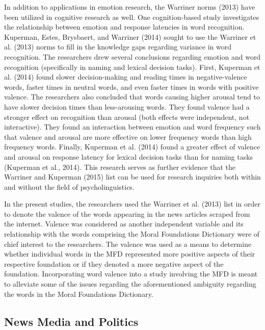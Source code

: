 \documentclass[,man]{apa6}
\begin{document}
In addition to applications in emotion research, the Warriner norms (2013) have been utilized in cognitive research as well. One cognition-based study investigates the relationship between emotion and response latencies in word recognition. Kuperman, Estes, Brysbaert, and Warriner (2014) sought to use the Warriner et al. (2013) norms to fill in the knowledge gaps regarding variance in word recognition. The researchers drew several conclusions regarding emotion and word recognition (specifically in naming and lexical decision tasks). First, Kuperman et al. (2014) found slower decision-making and reading times in negative-valence words, faster times in neutral words, and even faster times in words with positive valence. The researchers also concluded that words causing higher arousal tend to have slower decision times than less-arousing words. They found valence had a stronger effect on recognition than arousal (both effects were independent, not interactive). They found an interaction between emotion and word frequency such that valence and arousal are more effective on lower frequency words than high frequency words. Finally, Kuperman et al. (2014) found a greater effect of valence and arousal on response latency for lexical decision tasks than for naming tasks (Kuperman et al., 2014). This research serves as further evidence that the Warriner and Kuperman (2015) list can be used for research inquiries both within and without the field of psycholinguistics.

In the present studies, the researchers used the Warriner et al. (2013) list in order to denote the valence of the words appearing in the news articles scraped from the internet. Valence was considered as another independent variable and its relationship with the words comprising the Moral Foundations Dictionary were of chief interest to the researchers. The valence was used as a means to determine whether individual words in the MFD represented more positive aspects of their respective foundation or if they denoted a more negative aspect of the foundation. Incorporating word valence into a study involving the MFD is meant to alleviate some of the issues regarding the aforementioned ambiguity regarding the words in the Moral Foundations Dictionary.

\hypertarget{news-media-and-politics}{%
\subsection{News Media and Politics}\label{news-media-and-politics}}
\end{document}
